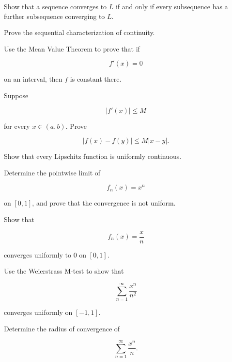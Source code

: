 \begin{exercise}[3]
Show that a sequence converges to \(L\) if and only if every subsequence
has a further subsequence converging to \(L\).
\end{exercise}

\begin{exercise}[3]
Prove the sequential characterization of continuity.
\end{exercise}

\begin{exercise}[3]
Use the Mean Value Theorem to prove that if

\[
f'(x)=0
\]

on an interval, then \(f\) is constant there.
\end{exercise}

\begin{exercise}[3]
Suppose

\[
|f'(x)|\leq M
\]

for every \(x\in(a,b)\). Prove

\[
|f(x)-f(y)|
\leq
M|x-y|.
\]
\end{exercise}

\begin{exercise}[3]
Show that every Lipschitz function is uniformly continuous.
\end{exercise}

\begin{exercise}[3]
Determine the pointwise limit of

\[
f_n(x)=x^n
\]

on \([0,1]\), and prove that the convergence is not uniform.
\end{exercise}

\begin{exercise}[3]
Show that

\[
f_n(x)=\frac{x}{n}
\]

converges uniformly to \(0\) on \([0,1]\).
\end{exercise}

\begin{exercise}[3]
Use the Weierstrass M-test to show that

\[
\sum_{n=1}^{\infty}
\frac{x^n}{n^2}
\]

converges uniformly on \([-1,1]\).
\end{exercise}

\begin{exercise}[3]
Determine the radius of convergence of

\[
\sum_{n=1}^{\infty}
\frac{x^n}{n}.
\]
\end{exercise}


